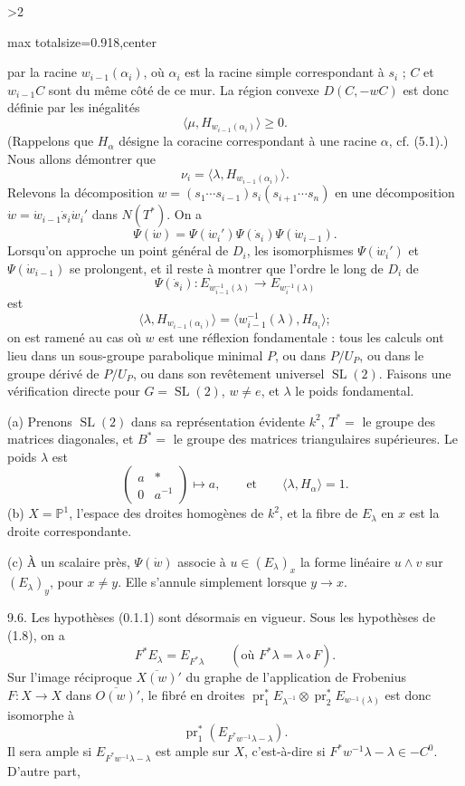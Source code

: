 \documentclass[9pt,twoside]{extarticle}
\newcommand{\EditionPage}[3]{%
  \ifnum#1>2\clearpage\fi
  \pdfbookmark[1]{Printed page #2}{fr-folio-#2}%
  \hypertarget{fr-physical-#1}{}%
  \noindent\begin{adjustbox}{max totalsize={\textwidth}{0.918\textheight},center}
  \begin{minipage}[t]{\textwidth}
  \fontsize{9.4}{11.1}\selectfont\justifying
  #3
  \end{minipage}
  \end{adjustbox}%
}
\begin{document}
\EditionPage{48}{149}{%
par la racine \(w_{i-1}(\alpha_i)\), où \(\alpha_i\) est la racine simple correspondant à \(s_i\) ; \(C\) et \(w_{i-1}C\) sont du même côté de ce mur. La région convexe \(D(C,-wC)\) est donc définie par les inégalités \[
\langle\mu,H_{w_{i-1}(\alpha_i)}\rangle\ge0.
\] (Rappelons que \(H_\alpha\) désigne la coracine correspondant à une racine \(\alpha\), cf. (5.1).) Nous allons démontrer que \[
\tag{9.5.1}
\nu_i=\langle\lambda,H_{w_{i-1}(\alpha_i)}\rangle.
\] Relevons la décomposition \(w=(s_1\cdots s_{i-1})s_i(s_{i+1}\cdots s_n)\) en une décomposition \(\dot w=\dot w_{i-1}\dot s_i\dot w_i'\) dans \(N(T^*)\). On a \[
\Psi(\dot w)=\Psi(\dot w_i')\Psi(\dot s_i)\Psi(\dot w_{i-1}).
\] Lorsqu'on approche un point général de \(D_i\), les isomorphismes \(\Psi(\dot w_i')\) et \(\Psi(\dot w_{i-1})\) se prolongent, et il reste à montrer que l'ordre le long de \(D_i\) de \[
\Psi(\dot s_i):E_{w_{i-1}^{-1}(\lambda)}\longrightarrow E_{w_i^{-1}(\lambda)}
\] est \[
\langle\lambda,H_{w_{i-1}(\alpha_i)}\rangle
=
\langle w_{i-1}^{-1}(\lambda),H_{\alpha_i}\rangle;
\] on est ramené au cas où \(w\) est une réflexion fondamentale : tous les calculs ont lieu dans un sous-groupe parabolique minimal \(P\), ou dans \(P/U_P\), ou dans le groupe dérivé de \(P/U_P\), ou dans son revêtement universel \(\operatorname{SL}(2)\). Faisons une vérification directe pour \(G=\operatorname{SL}(2)\), \(w\ne e\), et \(\lambda\) le poids fondamental.\par

(a) Prenons \(\operatorname{SL}(2)\) dans sa représentation évidente \(k^2\), \(T^*=\) le groupe des matrices diagonales, et \(B^*=\) le groupe des matrices triangulaires supérieures. Le poids \(\lambda\) est \[
\begin{pmatrix}a&*\\0&a^{-1}\end{pmatrix}\longmapsto a,
\qquad\text{et}\qquad
\langle\lambda,H_\alpha\rangle=1.
\] (b) \(X=\mathbb P^1\), l'espace des droites homogènes de \(k^2\), et la fibre de \(E_\lambda\) en \(x\) est la droite correspondante.\par

(c) À un scalaire près, \(\Psi(\dot w)\) associe à \(u\in(E_\lambda)_x\) la forme linéaire \(u\wedge v\) sur \((E_\lambda)_y\), pour \(x\ne y\). Elle s'annule simplement lorsque \(y\to x\).\par

9.6. Les hypothèses (0.1.1) sont désormais en vigueur. Sous les hypothèses de (1.8), on a \[
F^*E_\lambda=E_{F^*\lambda}\qquad(\text{où }F^*\lambda=\lambda\circ F).
\] Sur l'image réciproque \(\overline{X(w)}'\) du graphe de l'application de Frobenius \(F:X\to X\) dans \(\overline{O(w)}'\), le fibré en droites \(\operatorname{pr}_1^*E_{\lambda^{-1}}\otimes\operatorname{pr}_2^*E_{w^{-1}(\lambda)}\) est donc isomorphe à \[
\operatorname{pr}_1^*(E_{F^*w^{-1}\lambda-\lambda}).
\] Il sera ample si \(E_{F^*w^{-1}\lambda-\lambda}\) est ample sur \(X\), c'est-à-dire si \(F^*w^{-1}\lambda-\lambda\in-C^0\). D'autre part,\par
}
\end{document}
